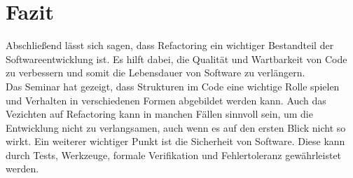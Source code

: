 \chapter{Fazit}
Abschließend lässt sich sagen, dass Refactoring ein wichtiger Bestandteil der Softwareentwicklung ist.
Es hilft dabei, die Qualität und Wartbarkeit von Code zu verbessern und somit die Lebensdauer von Software zu verlängern.\\
Das Seminar hat gezeigt, dass Strukturen im Code eine wichtige Rolle spielen und Verhalten in verschiedenen Formen abgebildet werden kann.
Auch das Vezichten auf Refactoring kann in manchen Fällen sinnvoll sein, um die Entwicklung nicht zu verlangsamen, auch wenn es auf den ersten Blick nicht so wirkt.
Ein weiterer wichtiger Punkt ist die Sicherheit von Software. Diese kann durch Tests, Werkzeuge, formale Verifikation und Fehlertoleranz gewährleistet werden.\\

